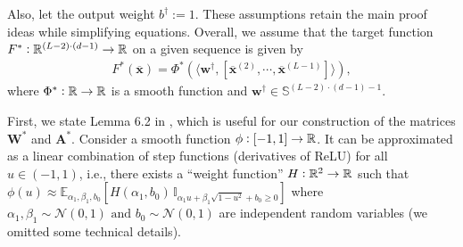 Also, let the output weight $b^{\dagger}:=1$. 
These assumptions retain the main proof ideas while simplifying equations. %
Overall, we assume that the target function $F^{\ast} : \mathbb{R}^{(L-2) \cdot (d-1)} \to \mathbb{R}$ on a given sequence is given by
\begin{align}\label{eqn:Fstar-Phi}
    F^{\ast}(\overline{\mathbf{x}}) = \Phi^{\ast}(\langle \mathbf{w}^{\dagger}, [\overline{\mathbf{x}}^{(2)}, \cdots, \overline{\mathbf{x}}^{(L-1)}]\rangle),
\end{align}
where $\Phi^{\ast}: \mathbb{R} \to \mathbb{R}$ is a smooth function and $\mathbf{w}^{\dagger} \in \mathbb{S}^{(L-2) \cdot (d-1) - 1}$. 





First, we state Lemma 6.2 in \cite{allen2019learning}, which is useful for our construction of the matrices $\mathbf{W}^{\ast}$ and $\mathbf{A}^{\ast}$.
Consider a smooth function $\phi: [-1, 1] \to \mathbb{R}$. It can be approximated as a linear combination of step functions (derivatives of ReLU) for all $u \in (-1, 1)$, i.e., there exists a ``weight function'' $H: \mathbb{R}^2 \to \mathbb{R}$ such that
$	 \phi\left(u\right) \approx \mathbb{E}_{\alpha_1, \beta_1, b_0} [{H\left(\alpha_{1}, b_0\right)} \, \mathbb{I}_{\alpha_{1} u + \beta_{1} \sqrt{1 - u^{2}} + b_0   \geq 0}]$
where $\alpha_1, \beta_1 \sim \mathcal{N}\left(0, 1\right) \text{ and } b_0 \sim \mathcal{N}\left(0, 1\right)$ are independent random variables (we omitted some technical details).

